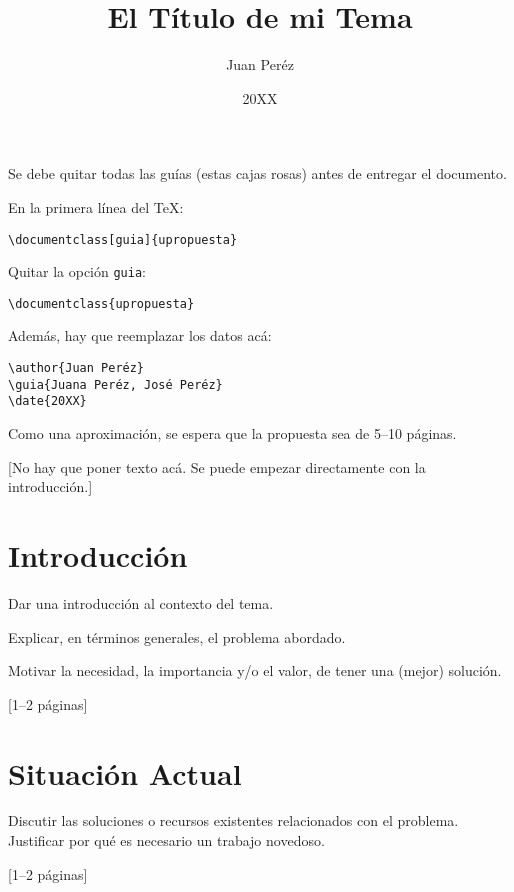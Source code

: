 \documentclass[guia]{upropuesta}
\title{El Título de mi Tema}
\author{Juan Peréz}
\date{20XX}
\begin{document}
\maketitle

\begin{pauta}
Se debe quitar todas las guías (estas cajas rosas) antes de entregar el documento.

En la primera línea del \TeX: 

\begin{verbatim}
\documentclass[guia]{upropuesta}
\end{verbatim}

Quitar la opción \texttt{guia}:

\begin{verbatim}
\documentclass{upropuesta}
\end{verbatim}

Además, hay que reemplazar los datos acá:

\begin{verbatim}
\author{Juan Peréz}
\guia{Juana Peréz, José Peréz}
\date{20XX}
\end{verbatim}

Como una aproximación, se espera que la propuesta sea de 5--10 páginas.

[No hay que poner texto acá. Se puede empezar directamente con la introducción.]
\end{pauta}

\section{Introducción}\label{sec:intro}

\begin{pauta}
Dar una introducción al contexto del tema.

Explicar, en términos generales, el problema abordado.

Motivar la necesidad, la importancia y/o el valor, de tener una (mejor) solución.

[1--2 páginas]
\end{pauta}

\section{Situación Actual}\label{sec:sa}

\begin{pauta}
Discutir las soluciones o recursos existentes relacionados con el problema. Justificar por qué es necesario un trabajo novedoso.

[1--2 páginas]
\end{pauta}
\end{document}
